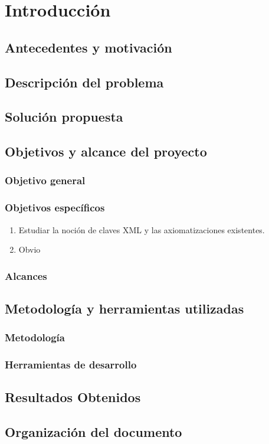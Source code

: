 \chapter{Introducción}
\label{cap:intro}

\section{Antecedentes y motivación}
\label{intro:motivacion}

\section{Descripción del problema}
\label{intro:problema}


\section{Solución propuesta}
\label{intro:solucion}


\section{Objetivos y alcance del proyecto}
\label{intro:objetivos}

\subsection{Objetivo general}

\subsection{Objetivos específicos}


\begin{enumerate}
  \item Estudiar la noción de claves XML y las axiomatizaciones existentes.
  \item Obvio 
\end{enumerate}

\subsection{Alcances}


\section{Metodología y herramientas utilizadas}
\label{intro:metodologia}

\subsection{Metodología}


\subsection{Herramientas de desarrollo}


\section{Resultados Obtenidos}
\label{intro:resultados}


\section{Organización del documento}
\label{intro:organizacion}

